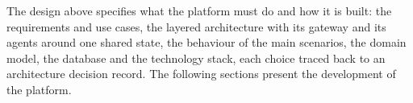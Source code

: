 The design above specifies what the platform must do and how it is
built: the requirements and use cases, the layered architecture with its
gateway and its agents around one shared state, the behaviour of the main
scenarios, the domain model, the database and the technology stack, each
choice traced back to an architecture decision record. The following
sections present the development of the platform.
